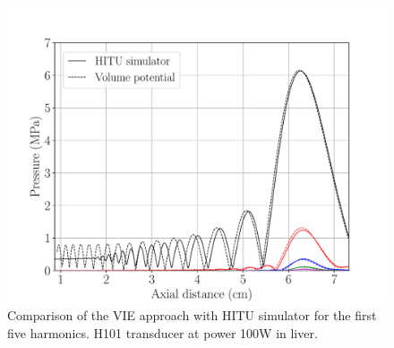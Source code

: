 \documentclass[preprint]{JASA}
\begin{document}
\begin{figure}[h!]
    \centering
    \includegraphics[width=\linewidth]{figures/H101_HITU_comparison_liver_power100.pdf}
    \caption{Comparison of the VIE approach with HITU simulator for the first 
    five harmonics. H101 transducer at power 100W in liver.}
    \label{fig:HITU_comparison_H101}
\end{figure}
\end{document}
